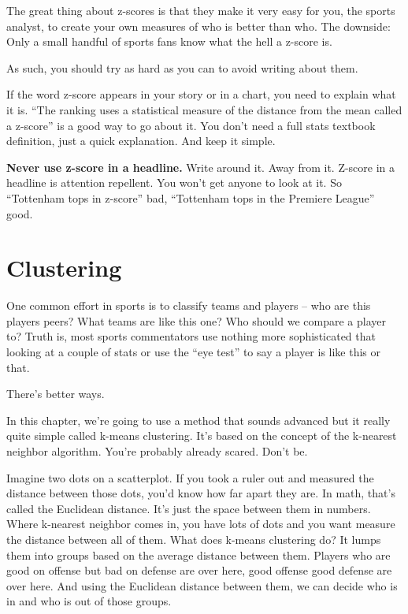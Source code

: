 \documentclass[
]{book}
\begin{document}
The great thing about z-scores is that they make it very easy for you, the sports analyst, to create your own measures of who is better than who. The downside: Only a small handful of sports fans know what the hell a z-score is.

As such, you should try as hard as you can to avoid writing about them.

If the word z-score appears in your story or in a chart, you need to explain what it is. ``The ranking uses a statistical measure of the distance from the mean called a z-score'' is a good way to go about it. You don't need a full stats textbook definition, just a quick explanation. And keep it simple.

\textbf{Never use z-score in a headline.} Write around it. Away from it. Z-score in a headline is attention repellent. You won't get anyone to look at it. So ``Tottenham tops in z-score'' bad, ``Tottenham tops in the Premiere League'' good.

\hypertarget{clustering}{%
\chapter{Clustering}\label{clustering}}

One common effort in sports is to classify teams and players -- who are this players peers? What teams are like this one? Who should we compare a player to? Truth is, most sports commentators use nothing more sophisticated that looking at a couple of stats or use the ``eye test'' to say a player is like this or that.

There's better ways.

In this chapter, we're going to use a method that sounds advanced but it really quite simple called k-means clustering. It's based on the concept of the k-nearest neighbor algorithm. You're probably already scared. Don't be.

Imagine two dots on a scatterplot. If you took a ruler out and measured the distance between those dots, you'd know how far apart they are. In math, that's called the Euclidean distance. It's just the space between them in numbers. Where k-nearest neighbor comes in, you have lots of dots and you want measure the distance between all of them. What does k-means clustering do? It lumps them into groups based on the average distance between them. Players who are good on offense but bad on defense are over here, good offense good defense are over here. And using the Euclidean distance between them, we can decide who is in and who is out of those groups.
\end{document}

